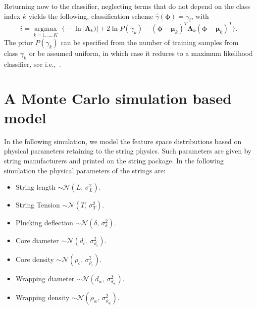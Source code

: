 \documentclass{article}
\begin{document}
\begin{sloppy}
%
Returning now to the classifier, neglecting terms that do not depend on the class index $k$ yields the following, classification scheme $\hat{\gamma}(\boldsymbol{\phi})={\gamma}_i$, with
%
\begin{equation}\label{eq:classifier}
  i=\underset{k=1,\dots,K}{\operatorname{argmax}}\;
\bigg\{ -\ln \lvert \boldsymbol{\Lambda}_k) \rvert + 2 \ln P(\gamma_k) - (\boldsymbol{\phi}-\boldsymbol{\mu}_k)^T \boldsymbol{\Lambda}_k (\boldsymbol{\phi}-\boldsymbol{\mu}_k)^T    %
\bigg\}.
\end{equation}
%
The prior $P(\gamma_k)$ can be specified from the number of training samples from class $\gamma_k$ or be assumed uniform, in which case it reduces to a maximum likelihood classifier, see i.e.,~\cite{mspr}.
%
\section{A Monte Carlo simulation based model}
In the following simulation, we model the feature space distributions based on physical parameters retaining to the string physics. Such parameters are given by string manufacturers and printed on the string package. In the following simulation the physical parameters of the strings are:
\begin{itemize}
    \item String length $\sim \mathcal{N}(L,\,\sigma_{L}^{2})$.
    \item String Tension $\sim \mathcal{N}(T,\,\sigma_{T}^{2})$.
    \item Plucking deflection $\sim \mathcal{N}(\delta,\,\sigma_{\delta}^{2})$.

    \item Core diameter $\sim \mathcal{N}(d_\text{c},\,\sigma_{d_\text{c}}^{2})$.
    \item Core density $\sim \mathcal{N}(\rho_\text{c},\,\sigma_{\rho_\text{c}}^{2})$.
    \item Wrapping diameter $\sim \mathcal{N}(d_\text{w},\,\sigma_{d_\text{w}}^{2})$.
    \item Wrapping density $\sim \mathcal{N}(\rho_\text{w},\,\sigma_{\rho_\text{w}}^{2})$.

\end{itemize}
%
%
%
%

\end{sloppy}
\end{document}
